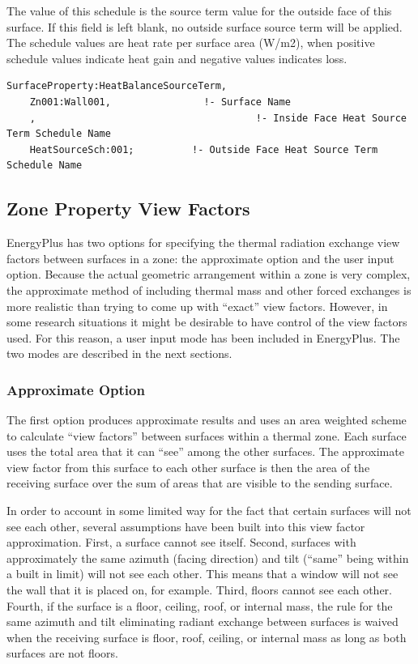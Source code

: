 The value of this schedule is the source term value for the outside face of this surface. If this field is left blank, no outside surface source term will be applied. The schedule values are heat rate per surface area (W/m2), when positive schedule values indicate heat gain and negative values indicates loss.

\begin{lstlisting}
SurfaceProperty:HeatBalanceSourceTerm,
    Zn001:Wall001,                !- Surface Name
    ,                                      !- Inside Face Heat Source Term Schedule Name
    HeatSourceSch:001;          !- Outside Face Heat Source Term Schedule Name
\end{lstlisting}

\subsection{Zone Property View Factors}\label{zone-property-view-factors}

EnergyPlus has two options for specifying the thermal radiation exchange view factors between surfaces in a zone: the approximate option and the user input option. Because the actual geometric arrangement within a zone is very complex, the approximate method of including thermal mass and other forced exchanges is more realistic than trying to come up with ``exact'' view factors. However, in some research situations it might be desirable to have control of the view factors used. For this reason, a user input mode has been included in EnergyPlus. The two modes are described in the next sections.

\subsubsection{Approximate Option}\label{approximate-option}

The first option produces approximate results and uses an area weighted scheme to calculate ``view factors'' between surfaces within a thermal zone. Each surface uses the total area that it can ``see'' among the other surfaces. The approximate view factor from this surface to each other surface is then the area of the receiving surface over the sum of areas that are visible to the sending surface.

In order to account in some limited way for the fact that certain surfaces will not see each other, several assumptions have been built into this view factor approximation. First, a surface cannot see itself. Second, surfaces with approximately the same azimuth (facing direction) and tilt (``same'' being within a built in limit) will not see each other. This means that a window will not see the wall that it is placed on, for example. Third, floors cannot see each other. Fourth, if the surface is a floor, ceiling, roof, or internal mass, the rule for the same azimuth and tilt eliminating radiant exchange between surfaces is waived when the receiving surface is floor, roof, ceiling, or internal mass as long as both surfaces are not floors.

